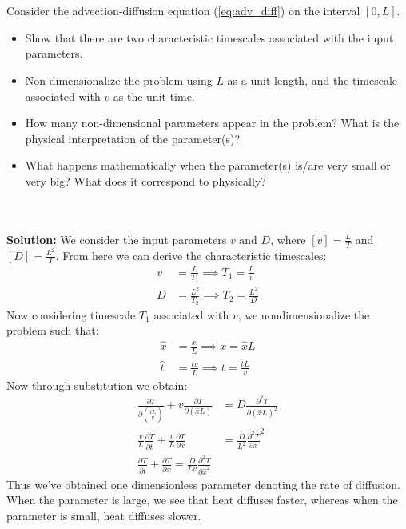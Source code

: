 \\
\\
 Consider the advection-diffusion equation (\ref{eq:adv_diff}) on the interval $[0,L]$. 
\begin{itemize}
    \item Show that there are two characteristic timescales associated with the input parameters.
    \item Non-dimensionalize the problem using $L$ as a unit length, and the timescale associated with $v$ as the unit time. 
    \item How many non-dimensional parameters appear in the problem? What is the physical interpretation of the parameter(s)?
    \item What happens mathematically when the parameter(s) is/are very small or very big? What  does it correspond to physically?
\end{itemize}
\\
\\
{\color{red} {\bf Solution:}
We consider the input parameters $v \text{ and } D$, where $[v] = \frac{L}{T}$ and $[D] = \frac{L^2}{T}$. From here we can derive the characteristic timescales:
\begin{align*}
    v &= \frac{L}{T_1} \implies T_1 = \frac{L}{v}\\
    D &= \frac{L^2}{T_2} \implies T_2 = \frac{L^2}{D}
\end{align*}
Now considering timescale $T_1$ associated with $v$, we nondimensionalize the problem such that: 
\begin{align*}
    \hat{x} &= \frac{x}{L} \implies x = \hat{x}L\\
    \hat{t} &= \frac{tv}{L} \implies t = \frac{\hat{t}L}{v}
\end{align*}
Now through substitution we obtain: 
\begin{align*}
    \frac{\partial T}{\partial(\frac{\hat{t}L}{v})} + v\frac{\partial T}{\partial (\hat{x}L)} &= D\frac{\partial^2T}{\partial(\hat{x}L)^2}\\
    \frac{v}{L}\frac{\partial T}{\partial \hat{t}} + \frac{v}{L}\frac{\partial T}{\partial \hat{x}} &= \frac{D}{L^2}\frac{\partial ^2 T}{\partial\hat{x}}^2\\
    \frac{\partial T}{\partial \hat{t}} + \frac{\partial T}{\partial \hat{x}} = \frac{D}{Lv}\frac{\partial^2 T}{\partial \hat{x}^2}
\end{align*}
Thus we've obtained one dimensionless parameter denoting the rate of diffusion. When the parameter is large, we see that heat diffuses faster, whereas when the parameter is small, heat diffuses slower. 
}

